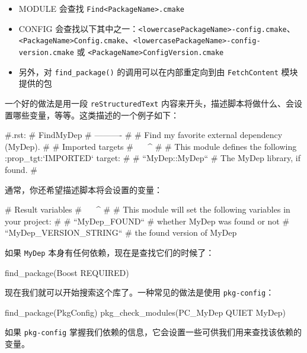 \begin{itemize}
\item MODULE 会查找 \texttt{Find<Package\allowbreak{}Name>.\allowbreak{}cmake}
\item CONFIG 会查找以下其中之一：\texttt{<lowercase\allowbreak{}Package\allowbreak{}Name>-config.\allowbreak{}cmake}、\texttt{<Package\allowbreak{}Name>Config.\allowbreak{}cmake}、\texttt{<lowercase\allowbreak{}Package\allowbreak{}Name>-config-version.\allowbreak{}cmake} 或 \texttt{<Package\allowbreak{}Name>Config\allowbreak{}Version.\allowbreak{}cmake}
\item 另外，对 \texttt{find\_\allowbreak{}package(\allowbreak{})\allowbreak{}} 的调用可以在内部重定向到由 \texttt{Fetch\allowbreak{}Content} 模块提供的包
\end{itemize}

一个好的做法是用一段 \texttt{re\allowbreak{}Structured\allowbreak{}Text} 内容来开头，描述脚本将做什么、会设置哪些变量，等等。这类描述的一个例子如下：

\begin{codebox}[text]
 #.rst:
 # FindMyDep
 # ----------
 #
 # Find my favorite external dependency (MyDep).
 #
 # Imported targets
 # ^^^^^^^^^^^^^^^^
 #
 # This module defines the following :prop_tgt:`IMPORTED` target:
 #
 # ``MyDep::MyDep``
 #   The MyDep library, if found.
 #
\end{codebox}

\label{idx:686}
\label{idx:687}
通常，你还希望描述脚本将会设置的变量：

\begin{codebox}[text]
 # Result variables
 # ^^^^^^^^^^^^^^^^
 #
 # This module will set the following variables in your project:
 #
 # ``MyDep_FOUND``
 #   whether MyDep was found or not
 # ``MyDep_VERSION_STRING``
 #   the found version of MyDep
\end{codebox}

如果 \texttt{MyDep} 本身有任何依赖，现在是查找它们的时候了：

\begin{codebox}[cmake]
find_package(Boost REQUIRED)
\end{codebox}

现在我们就可以开始搜索这个库了。一种常见的做法是使用 \texttt{pkg-config}：

\begin{codebox}[cmake]
find_package(PkgConfig)
pkg_check_modules(PC_MyDep QUIET MyDep)
\end{codebox}

如果 \texttt{pkg-config} 掌握我们依赖的信息，它会设置一些可供我们用来查找该依赖的变量。

